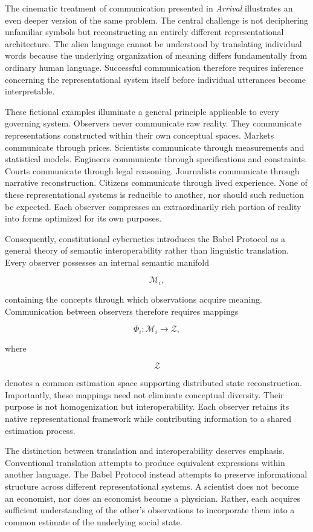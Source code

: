 \documentclass[12pt,a4paper]{article}
\begin{document}
The cinematic treatment of communication presented in \emph{Arrival} illustrates an even deeper version of the same problem. The central challenge is not deciphering unfamiliar symbols but reconstructing an entirely different representational architecture. The alien language cannot be understood by translating individual words because the underlying organization of meaning differs fundamentally from ordinary human language. Successful communication therefore requires inference concerning the representational system itself before individual utterances become interpretable.

These fictional examples illuminate a general principle applicable to every governing system. Observers never communicate raw reality. They communicate representations constructed within their own conceptual spaces. Markets communicate through prices. Scientists communicate through measurements and statistical models. Engineers communicate through specifications and constraints. Courts communicate through legal reasoning. Journalists communicate through narrative reconstruction. Citizens communicate through lived experience. None of these representational systems is reducible to another, nor should such reduction be expected. Each observer compresses an extraordinarily rich portion of reality into forms optimized for its own purposes.

Consequently, constitutional cybernetics introduces the Babel Protocol as a general theory of semantic interoperability rather than linguistic translation. Every observer possesses an internal semantic manifold

\[
\mathcal{M}_i,
\]

containing the concepts through which observations acquire meaning. Communication between observers therefore requires mappings

\[
\Phi_i :
\mathcal{M}_i
\rightarrow
\mathcal{Z},
\]

where

\[
\mathcal{Z}
\]

denotes a common estimation space supporting distributed state reconstruction. Importantly, these mappings need not eliminate conceptual diversity. Their purpose is not homogenization but interoperability. Each observer retains its native representational framework while contributing information to a shared estimation process.

The distinction between translation and interoperability deserves emphasis. Conventional translation attempts to produce equivalent expressions within another language. The Babel Protocol instead attempts to preserve informational structure across different representational systems. A scientist does not become an economist, nor does an economist become a physician. Rather, each acquires sufficient understanding of the other's observations to incorporate them into a common estimate of the underlying social state.
\end{document}
